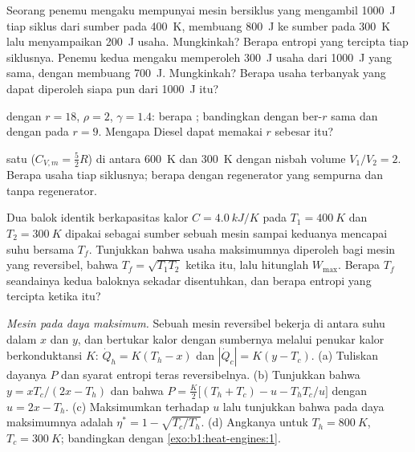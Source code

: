 \begin{exercise}[$\star\star$]\label{exo:b1:heat-engines:6}
Seorang penemu mengaku mempunyai mesin bersiklus yang mengambil \qty{1000}{J} tiap siklus
dari sumber pada \qty{400}{K}, membuang \qty{800}{J} ke sumber pada
\qty{300}{K} lalu menyampaikan \qty{200}{J} usaha. Mungkinkah? Berapa entropi yang tercipta
tiap siklusnya. Penemu kedua mengaku memperoleh \qty{300}{J} usaha dari
\qty{1000}{J} yang sama, dengan membuang \qty{700}{J}. Mungkinkah? Berapa usaha terbanyak
yang dapat diperoleh siapa pun dari \qty{1000}{J} itu?
\end{exercise}

\begin{exercise}[$\star\star$]\label{exo:b1:heat-engines:7}
 dengan $r = 18$, $\rho = 2$, $\gamma = 1.4$: berapa ;
bandingkan dengan  ber-$r$ sama dan dengan  pada
$r = 9$. Mengapa Diesel dapat memakai $r$ sebesar itu?
\end{exercise}

\begin{exercise}[$\star\star$]\label{exo:b1:heat-engines:8}
 satu   ($C_{V,m} = \tfrac52R$) di antara
\qty{600}{K} dan \qty{300}{K} dengan nisbah volume $V_1/V_2 = 2$. Berapa usaha tiap
siklusnya; berapa  dengan regenerator yang sempurna dan tanpa regenerator.
\end{exercise}

\begin{exercise}[$\star\star$]\label{exo:b1:heat-engines:9}
Dua balok identik berkapasitas kalor $C = \qty{4.0}{kJ/K}$ pada $T_1 =
\qty{400}{K}$ dan $T_2 = \qty{300}{K}$ dipakai sebagai sumber sebuah mesin
sampai keduanya mencapai suhu bersama $T_f$. Tunjukkan bahwa usaha maksimumnya
diperoleh bagi mesin yang reversibel, bahwa $T_f = \sqrt{T_1T_2}$ ketika itu, lalu
hitunglah $W_{\max}$. Berapa $T_f$ seandainya kedua baloknya sekadar
disentuhkan, dan berapa entropi yang tercipta ketika itu?
\end{exercise}

\begin{exercise}[$\star\star\star$]\label{exo:b1:heat-engines:10}
\emph{Mesin pada daya maksimum.} Sebuah mesin reversibel bekerja di antara
suhu dalam $x$ dan $y$, dan bertukar kalor dengan sumbernya
melalui penukar kalor berkonduktansi $K$: $\dot Q_h = K(T_h - x)$ dan
$|\dot Q_c| = K(y - T_c)$. (a) Tuliskan dayanya $P$ dan syarat entropi
teras reversibelnya. (b) Tunjukkan bahwa $y = xT_c/(2x - T_h)$ dan
bahwa $P = \frac{K}{2}\bigl[(T_h + T_c) - u - T_hT_c/u\bigr]$ dengan $u = 2x - T_h$.
(c) Maksimumkan terhadap $u$ lalu tunjukkan bahwa  pada daya maksimumnya adalah
$\eta^\ast = 1 - \sqrt{T_c/T_h}$. (d) Angkanya untuk $T_h = \qty{800}{K}$,
$T_c = \qty{300}{K}$; bandingkan dengan \cref{exo:b1:heat-engines:1}.
\end{exercise}


